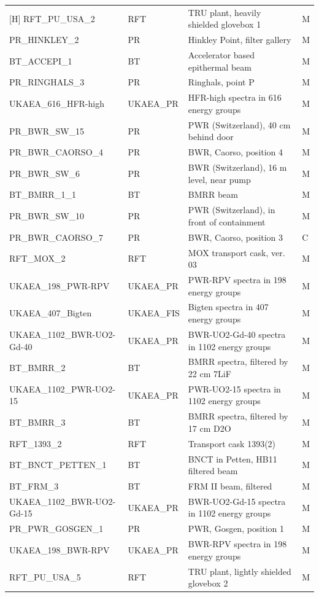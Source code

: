 \documentclass[a4paper, 12pt]{article}
\begin{document}
\begin{appendices}
\begin{longtable}{llll}[H]
RFT\_PU\_USA\_2 & RFT & TRU plant, heavily shielded glovebox 1  & M\\
PR\_HINKLEY\_2 & PR & Hinkley Point, filter gallery  & M\\
BT\_ACCEPI\_1 & BT & Accelerator based epithermal beam  & M\\
PR\_RINGHALS\_3 & PR & Ringhals, point P  & M\\
UKAEA\_616\_HFR-high & UKAEA\_PR & HFR-high spectra in 616 energy groups & M\\
PR\_BWR\_SW\_15 & PR & PWR (Switzerland), 40 cm behind door  & M\\
PR\_BWR\_CAORSO\_4 & PR & BWR, Caorso, position 4  & M\\
PR\_BWR\_SW\_6 & PR & BWR (Switzerland), 16 m level, near pump  & M\\
BT\_BMRR\_1\_1 & BT & BMRR beam  & M\\
PR\_BWR\_SW\_10 & PR & PWR (Switzerland), in front of containment  & M\\
PR\_BWR\_CAORSO\_7 & PR & BWR, Caorso, position 3  & C\\
RFT\_MOX\_2 & RFT & MOX transport cask, ver. 03  & M\\
UKAEA\_198\_PWR-RPV & UKAEA\_PR & PWR-RPV spectra in 198 energy groups & M\\
UKAEA\_407\_Bigten & UKAEA\_FIS & Bigten spectra in 407 energy groups & M\\
UKAEA\_1102\_BWR-UO2-Gd-40 & UKAEA\_PR & BWR-UO2-Gd-40 spectra in 1102 energy groups & M\\
BT\_BMRR\_2 & BT & BMRR spectra, filtered by 22 cm 7LiF  & M\\
UKAEA\_1102\_PWR-UO2-15 & UKAEA\_PR & PWR-UO2-15 spectra in 1102 energy groups & M\\
BT\_BMRR\_3 & BT & BMRR spectra, filtered by 17 cm D2O  & M\\
RFT\_1393\_2 & RFT & Transport cask 1393(2)  & M\\
BT\_BNCT\_PETTEN\_1 & BT & BNCT in Petten, HB11 filtered beam  & M\\
BT\_FRM\_3 & BT & FRM II beam, filtered  & M\\
UKAEA\_1102\_BWR-UO2-Gd-15 & UKAEA\_PR & BWR-UO2-Gd-15 spectra in 1102 energy groups & M\\
PR\_PWR\_GOSGEN\_1 & PR & PWR, Gosgen, position 1  & M\\
UKAEA\_198\_BWR-RPV & UKAEA\_PR & BWR-RPV spectra in 198 energy groups & M\\
RFT\_PU\_USA\_5 & RFT & TRU plant, lightly shielded glovebox 2  & M\\

\end{longtable}
\end{appendices}
\end{document}
